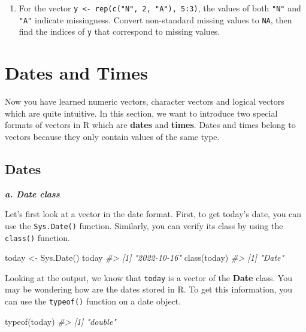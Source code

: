 \documentclass[
]{book}
\newenvironment{Shaded}{\begin{snugshade}}{\end{snugshade}}
\newcommand{\CommentTok}[1]{\textcolor[rgb]{0.56,0.35,0.01}{\textit{#1}}}
\newcommand{\FunctionTok}[1]{\textcolor[rgb]{0.00,0.00,0.00}{#1}}
\newcommand{\NormalTok}[1]{#1}
\newcommand{\OtherTok}[1]{\textcolor[rgb]{0.56,0.35,0.01}{#1}}
\providecommand{\tightlist}{%
  \setlength{\itemsep}{0pt}\setlength{\parskip}{0pt}}
\begin{document}
\begin{enumerate}
\def\labelenumi{\arabic{enumi}.}
\setcounter{enumi}{1}
\tightlist
\item
  For the vector \texttt{y\ \textless{}-\ rep(c("N",\ 2,\ "A"),\ 5:3)}, the values of both \texttt{"N"} and \texttt{"A"} indicate missingness. Convert non-standard missing values to \texttt{NA}, then find the indices of \texttt{y} that correspond to missing values.
\end{enumerate}

\hypertarget{date-time}{%
\section{Dates and Times}\label{date-time}}

Now you have learned numeric vectors, character vectors and logical vectors which are quite intuitive. In this section, we want to introduce two special formats of vectors in R which are \textbf{dates} and \textbf{times}. Dates and times belong to vectors because they only contain values of the same type.

\hypertarget{dates}{%
\subsection{Dates}\label{dates}}

\textbf{\emph{a. Date class}}

Let's first look at a vector in the date format. First, to get today's date, you can use the \texttt{Sys.Date()} function. Similarly, you can verify its class by using the \texttt{class()} function.

\begin{Shaded}
\begin{Highlighting}[]
\NormalTok{today }\OtherTok{\textless{}{-}} \FunctionTok{Sys.Date}\NormalTok{()}
\NormalTok{today}
\CommentTok{\#\textgreater{} [1] "2022{-}10{-}16"}
\FunctionTok{class}\NormalTok{(today)}
\CommentTok{\#\textgreater{} [1] "Date"}
\end{Highlighting}
\end{Shaded}

Looking at the output, we know that \texttt{today} is a vector of the \textbf{Date} class. You may be wondering how are the dates stored in R. To get this information, you can use the \texttt{typeof()} function on a date object.

\begin{Shaded}
\begin{Highlighting}[]
\FunctionTok{typeof}\NormalTok{(today)}
\CommentTok{\#\textgreater{} [1] "double"}
\end{Highlighting}
\end{Shaded}
\end{document}
